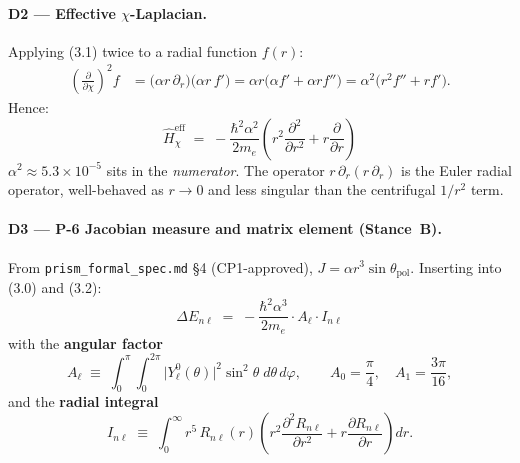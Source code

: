 \documentclass[11pt]{article}
\newcommand{\me}{m_e}
\begin{document}
\paragraph{D2 --- Effective $\chi$-Laplacian.}
Applying (3.1) twice to a radial function $f(r)$:
\begin{align}
  \left(\frac{\partial}{\partial\chi}\right)^{\!2}\!f
  &= \bigl(\alpha r\,\partial_r\bigr)\!\bigl(\alpha r\,f'\bigr)
   = \alpha r\bigl(\alpha f' + \alpha r f''\bigr)
   = \alpha^2\bigl(r^2 f'' + r f'\bigr).
\end{align}
Hence:
\begin{equation}
  \boxed{\hat{H}_\chi^{\mathrm{eff}}
  \;=\; -\frac{\hbar^2\alpha^2}{2\me}
  \!\left(r^2\frac{\partial^2}{\partial r^2} + r\frac{\partial}{\partial r}\right)}
  \tag{3.2}
\end{equation}
$\alpha^2\!\approx\!5.3\!\times\!10^{-5}$ sits in the \emph{numerator}.
The operator $r\,\partial_r(r\,\partial_r)$ is the Euler radial operator,
well-behaved as $r\!\to\!0$ and less singular than the centrifugal $1/r^2$ term.

\paragraph{D3 --- P-6 Jacobian measure and matrix element (Stance~B).}
From \texttt{prism\_formal\_spec.md} \S4 (CP1-approved),
$J = \alpha r^3\sin\theta_{\mathrm{pol}}$. Inserting into (3.0) and (3.2):
\begin{equation}
  \Delta E_{n\ell}
  \;=\; -\frac{\hbar^2\alpha^3}{2\me}\cdot A_\ell\cdot I_{n\ell}
  \tag{3.3}
\end{equation}
with the \textbf{angular factor}
\begin{equation}
  A_\ell \;\equiv\;
  \int_0^\pi\!\!\int_0^{2\pi}
  \bigl|Y_\ell^0(\theta)\bigr|^2 \sin^2\!\theta\;d\theta\,d\varphi,
  \qquad
  A_0 = \frac{\pi}{4},\quad A_1 = \frac{3\pi}{16},
  \tag{3.4}
\end{equation}
and the \textbf{radial integral}
\begin{equation}
  I_{n\ell} \;\equiv\;
  \int_0^\infty r^5\,R_{n\ell}(r)
  \!\left(r^2\frac{\partial^2 R_{n\ell}}{\partial r^2}
         + r\frac{\partial R_{n\ell}}{\partial r}\right)dr.
  \tag{3.5}
\end{equation}
\end{document}
